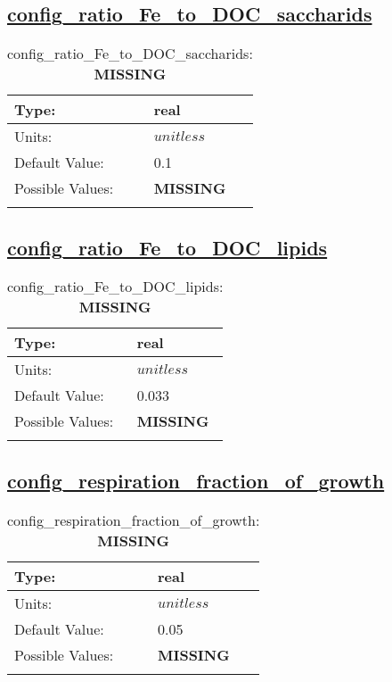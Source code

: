 \subsection[config\_ratio\_Fe\_to\_DOC\_saccharids]{\hyperref[sec:nm_tab_biogeochemistry]{config\_ratio\_Fe\_to\_DOC\_saccharids}}
\label{subsec:nm_sec_config_ratio_Fe_to_DOC_saccharids}
\begin{center}
\begin{longtable}{| p{2.0in} || p{4.0in} |}
    \hline
    Type: & real \\
    \hline
    Units: & $unitless$ \\
    \hline
    Default Value: & 0.1 \\
    \hline
    Possible Values: & {\bf \color{red} MISSING} \\
    \hline
    \caption{config\_ratio\_Fe\_to\_DOC\_saccharids: {\bf \color{red} MISSING}}
\end{longtable}
\end{center}
\subsection[config\_ratio\_Fe\_to\_DOC\_lipids]{\hyperref[sec:nm_tab_biogeochemistry]{config\_ratio\_Fe\_to\_DOC\_lipids}}
\label{subsec:nm_sec_config_ratio_Fe_to_DOC_lipids}
\begin{center}
\begin{longtable}{| p{2.0in} || p{4.0in} |}
    \hline
    Type: & real \\
    \hline
    Units: & $unitless$ \\
    \hline
    Default Value: & 0.033 \\
    \hline
    Possible Values: & {\bf \color{red} MISSING} \\
    \hline
    \caption{config\_ratio\_Fe\_to\_DOC\_lipids: {\bf \color{red} MISSING}}
\end{longtable}
\end{center}
\subsection[config\_respiration\_fraction\_of\_growth]{\hyperref[sec:nm_tab_biogeochemistry]{config\_respiration\_fraction\_of\_growth}}
\label{subsec:nm_sec_config_respiration_fraction_of_growth}
\begin{center}
\begin{longtable}{| p{2.0in} || p{4.0in} |}
    \hline
    Type: & real \\
    \hline
    Units: & $unitless$ \\
    \hline
    Default Value: & 0.05 \\
    \hline
    Possible Values: & {\bf \color{red} MISSING} \\
    \hline
    \caption{config\_respiration\_fraction\_of\_growth: {\bf \color{red} MISSING}}
\end{longtable}
\end{center}

